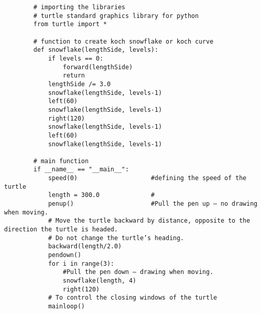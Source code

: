 \documentclass{article}
\begin{document}
    \begin{verbatim}
        # importing the libraries
        # turtle standard graphics library for python
        from turtle import *

        # function to create koch snowflake or koch curve
        def snowflake(lengthSide, levels):
            if levels == 0:
                forward(lengthSide)
                return
            lengthSide /= 3.0
            snowflake(lengthSide, levels-1)
            left(60)
            snowflake(lengthSide, levels-1)
            right(120)
            snowflake(lengthSide, levels-1)
            left(60)
            snowflake(lengthSide, levels-1)

        # main function
        if __name__ == "__main__":
            speed(0)                    #defining the speed of the turtle
            length = 300.0              #
            penup()                     #Pull the pen up – no drawing when moving.
            # Move the turtle backward by distance, opposite to the direction the turtle is headed.
            # Do not change the turtle’s heading.
            backward(length/2.0)
            pendown()
            for i in range(3):
                #Pull the pen down – drawing when moving.
                snowflake(length, 4)
                right(120)
            # To control the closing windows of the turtle
            mainloop()
    \end{verbatim}
\end{document}
